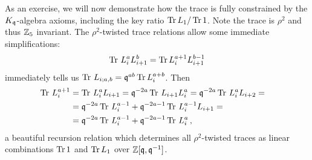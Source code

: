 \documentclass[12pt]{amsart}
\begin{document}
As an exercise, we will now demonstrate how the trace is fully constrained by the $K_{\mathfrak{q}}$-algebra axioms, including the key ratio $\operatorname{Tr} L_1/\operatorname{Tr} 1$.  Note the trace is $\rho^2$ and thus $\mathbb{Z}_5$ invariant. The $\rho^2$-twisted trace relations allow some immediate simplifications: 
\begin{equation} \label{eq:izero}
	 \operatorname{Tr} \,L_i^a L_{i+1}^b =   \operatorname{Tr} L_i^{a+1} L_{i+1}^{b-1} 
\end{equation}
immediately tells us $\operatorname{Tr}\, L_{i;a,b} = \mathfrak{q}^{ab} \operatorname{Tr} L_i^{a+b}$. Then 
\begin{align}
	\operatorname{Tr}\, L^{a+1}_i &= \operatorname{Tr}\, L^a_i L_{i+1} = \mathfrak{q}^{-2a} \operatorname{Tr}\, L_{i+1} L_i^{a} = \mathfrak{q}^{-2a} \operatorname{Tr} \,L_i^{a} L_{i+2} =\cr &= \mathfrak{q}^{-2a} \operatorname{Tr} \,L_i^{a-1}+\mathfrak{q}^{-2a-1} \operatorname{Tr} \,L_i^{a-1} L_{i+1}= \cr &=\mathfrak{q}^{-2a} \operatorname{Tr} \,L_i^{a-1}+\mathfrak{q}^{-2a-1} \operatorname{Tr} \,L_i^{a}\, ,
\end{align}
a beautiful recursion relation which determines all $\rho^2$-twisted traces as linear combinations $\operatorname{Tr} 1$ and $\operatorname{Tr} L_1$ over $\mathbb{Z}[\mathfrak{q}, \mathfrak{q}^{-1}]$. 
\end{document}
